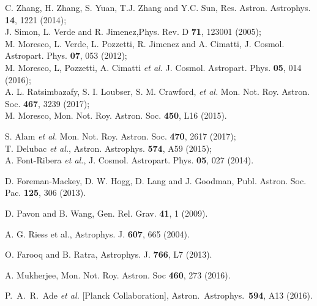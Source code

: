 \documentclass[11pt]{article}
\begin{document}
\begin{thebibliography}{}
C. Zhang, H. Zhang, S. Yuan, T.J. Zhang and Y.C. Sun, Res. Astron. Astrophys. {\bf 14}, 1221 (2014);\\
               J. Simon, L. Verde and R. Jimenez,Phys. Rev. D {\bf 71}, 123001 (2005);\\
               M. Moresco, L. Verde, L. Pozzetti, R. Jimenez and A. Cimatti, J. Cosmol. Astropart. Phys. {\bf 07}, 053 (2012);\\
               M. Moresco, L, Pozzetti, A. Cimatti {\it et al.}  J. Cosmol. Astropart. Phys. {\bf 05}, 014  (2016);\\
               A. L. Ratsimbazafy, S. I. Loubser, S. M. Crawford, {\it et al.} Mon. Not. Roy. Astron. Soc. {\bf 467}, 3239 (2017);\\ 
               M. Moresco, Mon. Not. Roy. Astron. Soc.  {\bf 450}, L16 (2015).







S. Alam {\it et al.} Mon. Not. Roy. Astron. Soc. {\bf 470}, 2617 (2017);\\


T. Delubac {\it et al.},  Astron. Astrophys. {\bf 574}, A59 (2015);\\
                A. Font-Ribera {\it et al.}, J. Cosmol. Astropart. Phys. {\bf 05}, 027 (2014).









D. Foreman-Mackey, D. W. Hogg, D. Lang and J. Goodman, Publ. Astron. Soc. Pac. {\bf 125}, 306 (2013).

D. Pavon and B. Wang, Gen. Rel. Grav. {\bf 41}, 1 (2009).

A. G. Riess et al., Astrophys. J. {\bf 607}, 665 (2004).

O. Farooq and B. Ratra, Astrophys. J. {\bf 766}, L7 (2013).

A. Mukherjee, Mon. Not. Roy. Astron. Soc {\bf 460}, 273 (2016).



  P.~A.~R.~Ade {\it et al.} [Planck Collaboration],
  Astron.\ Astrophys.\  {\bf 594}, A13 (2016).


\end{thebibliography}
\end{document}
